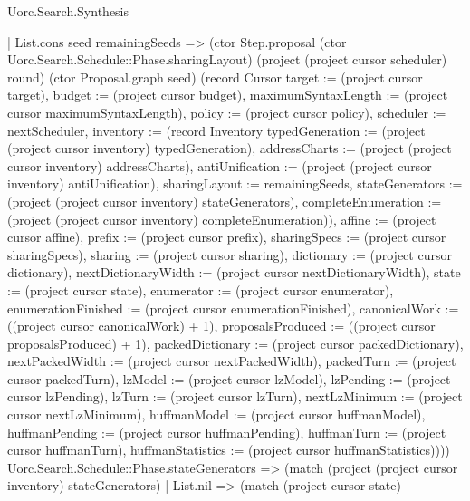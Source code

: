 \begin{lexlean}{Uorc.Search.Synthesis}
\begin{semanticmodule}
{      | List.cons seed remainingSeeds => (ctor Step.proposal (ctor Uorc.Search.Schedule::Phase.sharingLayout) (project (project cursor scheduler) round) (ctor Proposal.graph seed) (record Cursor {target := (project cursor target), budget := (project cursor budget), maximumSyntaxLength := (project cursor maximumSyntaxLength), policy := (project cursor policy), scheduler := nextScheduler, inventory := (record Inventory {typedGeneration := (project (project cursor inventory) typedGeneration), addressCharts := (project (project cursor inventory) addressCharts), antiUnification := (project (project cursor inventory) antiUnification), sharingLayout := remainingSeeds, stateGenerators := (project (project cursor inventory) stateGenerators), completeEnumeration := (project (project cursor inventory) completeEnumeration)}), affine := (project cursor affine), prefix := (project cursor prefix), sharingSpecs := (project cursor sharingSpecs), sharing := (project cursor sharing), dictionary := (project cursor dictionary), nextDictionaryWidth := (project cursor nextDictionaryWidth), state := (project cursor state), enumerator := (project cursor enumerator), enumerationFinished := (project cursor enumerationFinished), canonicalWork := ((project cursor canonicalWork) + 1), proposalsProduced := ((project cursor proposalsProduced) + 1), packedDictionary := (project cursor packedDictionary), nextPackedWidth := (project cursor nextPackedWidth), packedTurn := (project cursor packedTurn), lzModel := (project cursor lzModel), lzPending := (project cursor lzPending), lzTurn := (project cursor lzTurn), nextLzMinimum := (project cursor nextLzMinimum), huffmanModel := (project cursor huffmanModel), huffmanPending := (project cursor huffmanPending), huffmanTurn := (project cursor huffmanTurn), huffmanStatistics := (project cursor huffmanStatistics)})))
    | Uorc.Search.Schedule::Phase.stateGenerators => (match (project (project cursor inventory) stateGenerators)
      | List.nil => (match (project cursor state)
}
\end{semanticmodule}
\end{lexlean}
